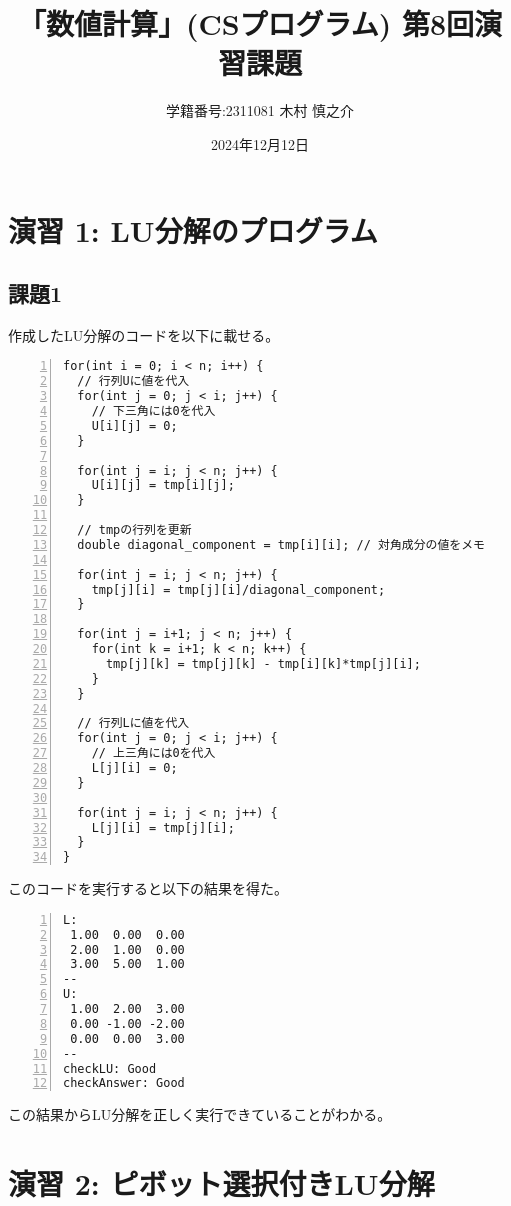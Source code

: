 \documentclass[a4paper]{jsarticle}
\title{「数値計算」(CSプログラム) 第8回演習課題}
\author{学籍番号:2311081 木村 慎之介}
\date{2024年12月12日}
\begin{document}
\maketitle

\section*{演習 1: LU分解のプログラム}

\subsection*{課題1}
作成したLU分解のコードを以下に載せる。
\begin{lstlisting}[caption={\texttt{単純なLU分解のプログラム}},numbers=left]
for(int i = 0; i < n; i++) {
  // 行列Uに値を代入
  for(int j = 0; j < i; j++) {
    // 下三角には0を代入
    U[i][j] = 0;
  }

  for(int j = i; j < n; j++) {
    U[i][j] = tmp[i][j];
  }

  // tmpの行列を更新
  double diagonal_component = tmp[i][i]; // 対角成分の値をメモ

  for(int j = i; j < n; j++) {
    tmp[j][i] = tmp[j][i]/diagonal_component;
  }

  for(int j = i+1; j < n; j++) {
    for(int k = i+1; k < n; k++) {
      tmp[j][k] = tmp[j][k] - tmp[i][k]*tmp[j][i];
    }
  }

  // 行列Lに値を代入
  for(int j = 0; j < i; j++) {
    // 上三角には0を代入
    L[j][i] = 0;
  }

  for(int j = i; j < n; j++) {
    L[j][i] = tmp[j][i];
  }
}
\end{lstlisting}

このコードを実行すると以下の結果を得た。

\begin{lstlisting}[caption={\texttt{LU分解プログラムの実行結果}},numbers=left]
L:
 1.00  0.00  0.00
 2.00  1.00  0.00
 3.00  5.00  1.00
--
U:
 1.00  2.00  3.00
 0.00 -1.00 -2.00
 0.00  0.00  3.00
--
checkLU: Good
checkAnswer: Good

\end{lstlisting}

この結果からLU分解を正しく実行できていることがわかる。

\section*{演習 2: ピボット選択付きLU分解}
\end{document}
